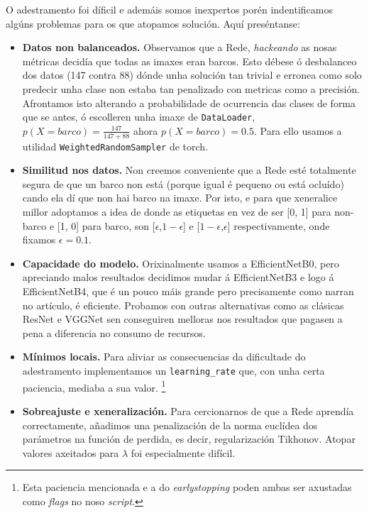 \documentclass{article}
\begin{document}
O adestramento foi díficil e ademáis somos inexpertos porén indentificamos algúns problemas para os que atopamos solución. Aquí preséntanse:
\begin{itemize}
	\item \textbf{Datos non balanceados.} Observamos que a Rede, \emph{hackeando} as nosas métricas decidía que todas as imaxes eran barcos. Esto débese ó desbalanceo dos datos (147 contra 88) dónde unha solución tan trivial e erronea como solo predecir unha clase non estaba tan penalizado con metricas como a precisión. Afrontamos isto alterando a probabilidade de ocurrencia das clases de forma que se antes, ó escolleren unha imaxe de \texttt{DataLoader}, $p(X=barco) = \frac{147}{147+88}$ ahora $p(X = barco) = 0.5$. Para ello usamos a utilidad \texttt{WeightedRandomSampler} de torch.
	\item \textbf{Similitud nos datos.} Non creemos conveniente que a Rede esté totalmente segura de que un barco non está (porque igual é pequeno ou está ocluído) cando ela dí que non hai barco na imaxe. Por isto, e para que xeneralice millor adoptamos a idea de \cite{DBLP:journals/corr/SzegedyVISW15} donde as etiquetas en vez de ser [0, 1] para non-barco e [1, 0] para barco, son [$\epsilon$,$1 - \epsilon$] e [$1- \epsilon$,$\epsilon$] respectivamente, onde fixamos $\epsilon = 0.1$.
	\item \textbf{Capacidade do modelo.} Orixinalmente usamos a EfficientNetB0, pero apreciando malos resultados decidimos mudar á EfficientNetB3 e logo á EfficientNetB4, que é un pouco máis grande pero precisamente como narran no artículo, é eficiente. Probamos con outras alternativas como as clásicas ResNet e VGGNet sen conseguiren melloras nos resultados que pagasen a pena a diferencia no consumo de recursos.
	\item \textbf{Mínimos locais.} Para aliviar as consecuencias da dificultade do adestramento implementamos un \texttt{learning\_rate} que, con unha certa paciencia, mediaba a sua valor. \footnote{Esta paciencia mencionada e a do \emph{earlystopping} poden ambas ser axustadas como \emph{flags} no noso \emph{script}.}
	\item \textbf{Sobreajuste e xeneralización.} Para cercionarnos de que a Rede aprendía correctamente, añadimos una penalización de la norma euclídea dos parámetros na función de perdida, es decir, regularización Tikhonov. Atopar valores axeitados para $\lambda$ foi especialmente difícil.
\end{itemize}
\end{document}
